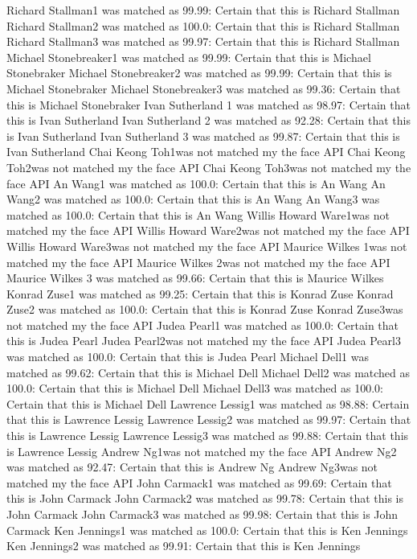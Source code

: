 \documentclass[12pt,a4paper]{article}
\begin{document}
\begin{appendices}
Richard Stallman1 was matched as 99.99: Certain that this is Richard Stallman
Richard Stallman2 was matched as 100.0: Certain that this is Richard Stallman
Richard Stallman3 was matched as 99.97: Certain that this is Richard Stallman
Michael Stonebreaker1 was matched as 99.99: Certain that this is Michael Stonebraker
Michael Stonebreaker2 was matched as 99.99: Certain that this is Michael Stonebraker
Michael Stonebreaker3 was matched as 99.36: Certain that this is Michael Stonebraker
Ivan Sutherland 1 was matched as 98.97: Certain that this is Ivan Sutherland
Ivan Sutherland 2 was matched as 92.28: Certain that this is Ivan Sutherland
Ivan Sutherland 3 was matched as 99.87: Certain that this is Ivan Sutherland
Chai Keong Toh1was not matched my the face API
Chai Keong Toh2was not matched my the face API
Chai Keong Toh3was not matched my the face API
An Wang1 was matched as 100.0: Certain that this is An Wang
An Wang2 was matched as 100.0: Certain that this is An Wang
An Wang3 was matched as 100.0: Certain that this is An Wang
Willis Howard Ware1was not matched my the face API
Willis Howard Ware2was not matched my the face API
Willis Howard Ware3was not matched my the face API
Maurice Wilkes 1was not matched my the face API
Maurice Wilkes 2was not matched my the face API
Maurice Wilkes 3 was matched as 99.66: Certain that this is Maurice Wilkes
Konrad Zuse1 was matched as 99.25: Certain that this is Konrad Zuse
Konrad Zuse2 was matched as 100.0: Certain that this is Konrad Zuse
Konrad Zuse3was not matched my the face API
Judea Pearl1 was matched as 100.0: Certain that this is Judea Pearl
Judea Pearl2was not matched my the face API
Judea Pearl3 was matched as 100.0: Certain that this is Judea Pearl
Michael Dell1 was matched as 99.62: Certain that this is Michael Dell
Michael Dell2 was matched as 100.0: Certain that this is Michael Dell
Michael Dell3 was matched as 100.0: Certain that this is Michael Dell
Lawrence Lessig1 was matched as 98.88: Certain that this is Lawrence Lessig
Lawrence Lessig2 was matched as 99.97: Certain that this is Lawrence Lessig
Lawrence Lessig3 was matched as 99.88: Certain that this is Lawrence Lessig
Andrew Ng1was not matched my the face API
Andrew Ng2 was matched as 92.47: Certain that this is Andrew Ng
Andrew Ng3was not matched my the face API
John Carmack1 was matched as 99.69: Certain that this is John Carmack
John Carmack2 was matched as 99.78: Certain that this is John Carmack
John Carmack3 was matched as 99.98: Certain that this is John Carmack
Ken Jennings1 was matched as 100.0: Certain that this is Ken Jennings
Ken Jennings2 was matched as 99.91: Certain that this is Ken Jennings

\end{appendices}
\end{document}
